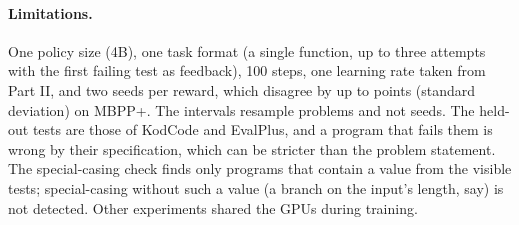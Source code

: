 \paragraph{Limitations.} One policy size (4B), one task format (a single function, up to three attempts with the
first failing test as feedback), 100 steps, one learning rate taken from Part II, and two seeds per reward, which
disagree by up to  points (standard deviation) on MBPP+. The intervals resample problems and not
seeds. The held-out tests are those of KodCode and EvalPlus, and a program that fails them is wrong by their
specification, which can be stricter than the problem statement. The special-casing check finds only programs that
contain a value from the visible tests; special-casing without such a value (a branch on the input's length, say) is
not detected. Other experiments shared the GPUs during training.
